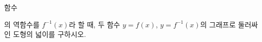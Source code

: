 함수 \par\smallskip{}\par\smallskip\noindent 의 역함수를 $f^{-1}(x)$라 할 때, 두 함수 $y=f(x)$, $y=f^{-1}(x)$의 그래프로 둘러싸인 도형의 넓이를 구하시오.
